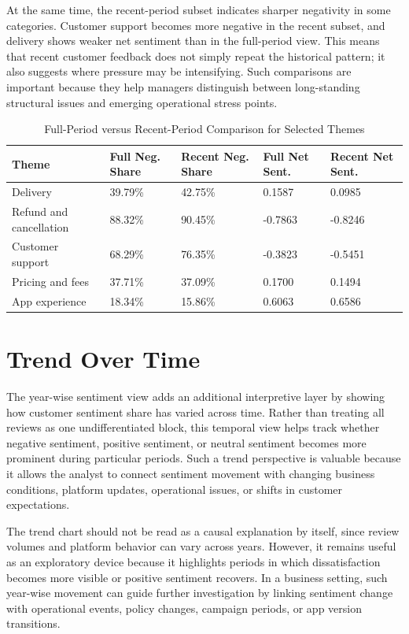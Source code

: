 At the same time, the recent-period subset indicates sharper negativity in some categories. Customer support becomes more negative in the recent subset, and delivery shows weaker net sentiment than in the full-period view. This means that recent customer feedback does not simply repeat the historical pattern; it also suggests where pressure may be intensifying. Such comparisons are important because they help managers distinguish between long-standing structural issues and emerging operational stress points.

\begin{table}[h]
\centering
\caption{Full-Period versus Recent-Period Comparison for Selected Themes}
\small
\begin{tabular}{L{0.27\textwidth}C{0.15\textwidth}C{0.16\textwidth}C{0.14\textwidth}C{0.14\textwidth}}
\toprule
\textbf{Theme} & \textbf{Full Neg. Share} & \textbf{Recent Neg. Share} & \textbf{Full Net Sent.} & \textbf{Recent Net Sent.} \\
\midrule
Delivery & 39.79\% & 42.75\% & 0.1587 & 0.0985 \\
Refund and cancellation & 88.32\% & 90.45\% & -0.7863 & -0.8246 \\
Customer support & 68.29\% & 76.35\% & -0.3823 & -0.5451 \\
Pricing and fees & 37.71\% & 37.09\% & 0.1700 & 0.1494 \\
App experience & 18.34\% & 15.86\% & 0.6063 & 0.6586 \\
\bottomrule
\end{tabular}
\normalsize
\end{table}

\section{Trend Over Time}

The year-wise sentiment view adds an additional interpretive layer by showing how customer sentiment share has varied across time. Rather than treating all reviews as one undifferentiated block, this temporal view helps track whether negative sentiment, positive sentiment, or neutral sentiment becomes more prominent during particular periods. Such a trend perspective is valuable because it allows the analyst to connect sentiment movement with changing business conditions, platform updates, operational issues, or shifts in customer expectations.

The trend chart should not be read as a causal explanation by itself, since review volumes and platform behavior can vary across years. However, it remains useful as an exploratory device because it highlights periods in which dissatisfaction becomes more visible or positive sentiment recovers. In a business setting, such year-wise movement can guide further investigation by linking sentiment change with operational events, policy changes, campaign periods, or app version transitions.

